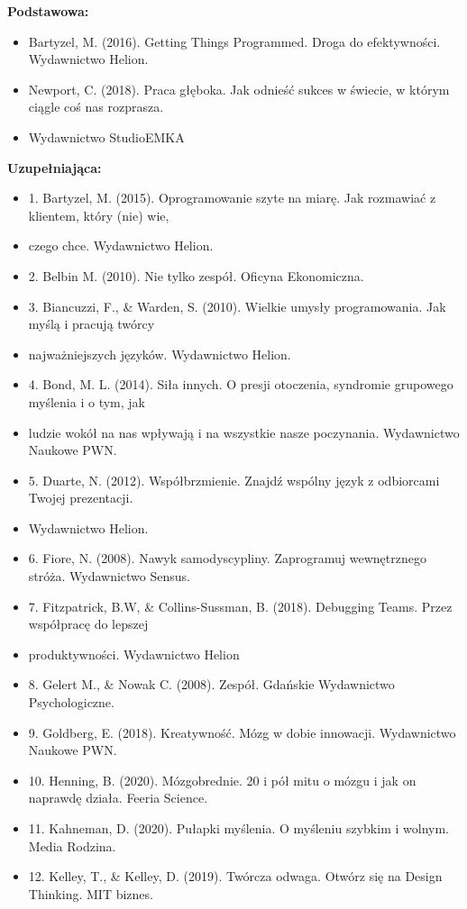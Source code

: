 \documentclass[12pt, a4paper]{article}
\begin{document}
\textbf{Podstawowa:}
\begin{itemize}
  \item Bartyzel, M. (2016). Getting Things Programmed. Droga do efektywności. Wydawnictwo Helion.
  \item Newport, C. (2018). Praca głęboka. Jak odnieść sukces w świecie, w którym ciągle coś nas rozprasza.
  \item Wydawnictwo StudioEMKA
\end{itemize}

\textbf{Uzupełniająca:}
\begin{itemize}
  \item 1. Bartyzel, M. (2015). Oprogramowanie szyte na miarę. Jak rozmawiać z klientem, który (nie) wie,
  \item czego chce. Wydawnictwo Helion.
  \item 2. Belbin M. (2010). Nie tylko zespół. Oficyna Ekonomiczna.
  \item 3. Biancuzzi, F., \& Warden, S. (2010). Wielkie umysły programowania. Jak myślą i pracują twórcy
  \item najważniejszych języków. Wydawnictwo Helion.
  \item 4. Bond, M. L. (2014). Siła innych. O presji otoczenia, syndromie grupowego myślenia i o tym, jak
  \item ludzie wokół na nas wpływają i na wszystkie nasze poczynania. Wydawnictwo Naukowe PWN.
  \item 5. Duarte, N. (2012). Współbrzmienie. Znajdź wspólny język z odbiorcami Twojej prezentacji.
  \item Wydawnictwo Helion.
  \item 6. Fiore, N. (2008). Nawyk samodyscypliny. Zaprogramuj wewnętrznego stróża. Wydawnictwo Sensus.
  \item 7. Fitzpatrick, B.W, \& Collins-Sussman, B. (2018). Debugging Teams. Przez współpracę do lepszej
  \item produktywności. Wydawnictwo Helion
  \item 8. Gelert M., \& Nowak C. (2008). Zespół. Gdańskie Wydawnictwo Psychologiczne.
  \item 9. Goldberg, E. (2018). Kreatywność. Mózg w dobie innowacji. Wydawnictwo Naukowe PWN.
  \item 10. Henning, B. (2020). Mózgobrednie. 20 i pół mitu o mózgu i jak on naprawdę działa. Feeria Science.
  \item 11. Kahneman, D. (2020). Pułapki myślenia. O myśleniu szybkim i wolnym. Media Rodzina.
  \item 12. Kelley, T., \& Kelley, D. (2019). Twórcza odwaga. Otwórz się na Design Thinking. MIT biznes.

\end{itemize}
\end{document}
